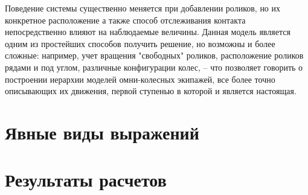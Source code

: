Поведение системы существенно меняется при добавлении роликов, но их конкретное расположение а также способ отслеживания контакта непосредственно влияют на наблюдаемые величины. Данная модель является одним из простейших способов получить решение, но возможны и более сложные: например, учет вращения "свободных" роликов, расположение роликов рядами и под углом, различные конфигурации колес, -- что позволяет говорить о построении иерархии моделей омни-колесных экипажей, все более точно описывающих их движения, первой ступенью в которой и является настоящая.



\newpage

\appendix

\section{Явные виды выражений}


\section{Результаты расчетов}





